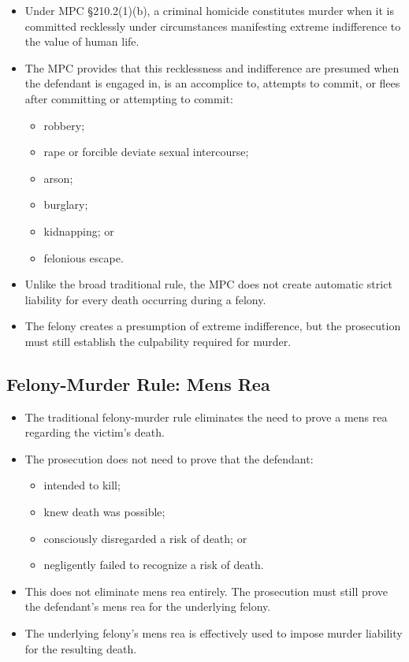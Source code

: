 \documentclass[11pt]{tex/lawoutline}
\begin{document}
{
\begin{itemize}
    \item Under MPC \S 210.2(1)(b), a criminal homicide constitutes murder when it is committed recklessly under circumstances manifesting extreme indifference to the value of human life.
    \item The MPC provides that this recklessness and indifference are presumed when the defendant is engaged in, is an accomplice to, attempts to commit, or flees after committing or attempting to commit:
    \begin{itemize}
        \item robbery;
        \item rape or forcible deviate sexual intercourse;
        \item arson;
        \item burglary;
        \item kidnapping; or
        \item felonious escape.
    \end{itemize}
    \item Unlike the broad traditional rule, the MPC does not create automatic strict liability for every death occurring during a felony.
    \item The felony creates a presumption of extreme indifference, but the prosecution must still establish the culpability required for murder.
\end{itemize}
}

\subsection{Felony-Murder Rule: Mens Rea}
\begin{itemize}
    \item The traditional felony-murder rule eliminates the need to prove a mens rea regarding the victim's death.
    \item The prosecution does not need to prove that the defendant:
    \begin{itemize}
        \item intended to kill;
        \item knew death was possible;
        \item consciously disregarded a risk of death; or
        \item negligently failed to recognize a risk of death.
    \end{itemize}
    \item This does not eliminate mens rea entirely. The prosecution must still prove the defendant's mens rea for the underlying felony.
    \item The underlying felony's mens rea is effectively used to impose murder liability for the resulting death.
\end{itemize}
\end{document}
